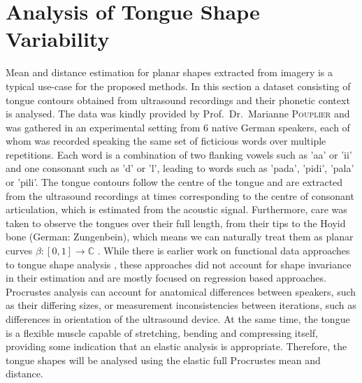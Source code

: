 \section{Analysis of Tongue Shape Variability}
\label{sec:4-tounges}
Mean and distance estimation for planar shapes extracted from imagery is a typical use-case for the proposed methods.
In this section a dataset consisting of tongue contours obtained from ultrasound recordings and their phonetic context is analysed.
The data was kindly provided by Prof.\ Dr.\ Marianne \textsc{Pouplier} and was gathered in an experimental setting from 6 native German speakers, each of whom was recorded speaking the same set of ficticious words over multiple repetitions.
Each word is a combination of two flanking vowels such as 'aa' or 'ii' and one consonant such as 'd' or 'l', leading to words such as 'pada', 'pidi', 'pala' or 'pili'.
The tongue contours follow the centre of the tongue and are extracted from the ultrasound recordings at times corresponding to the centre of consonant articulation, which is estimated from the acoustic signal.
Furthermore, care was taken to observe the tongues over their full length, from their tips to the Hoyid bone (German: Zungenbein),  which means we can naturally treat them as planar curves $\beta : [0,1] \rightarrow \mathbb{C}$ \parencite[see][]{consulting}.
While there is earlier work on functional data approaches to tongue shape analysis , these approaches did not account for shape invariance in their estimation and are mostly focused on regression based approaches.
Procrustes analysis can account for anatomical differences between speakers, such as their differing sizes, or measurement inconsistencies between iterations, such as differences in orientation of the ultrasound device.
At the same time, the tongue is a flexible muscle capable of stretching, bending and compressing itself, providing some indication that an elastic analysis is appropriate. 
Therefore, the tongue shapes will be analysed using the elastic full Procrustes mean and distance.

